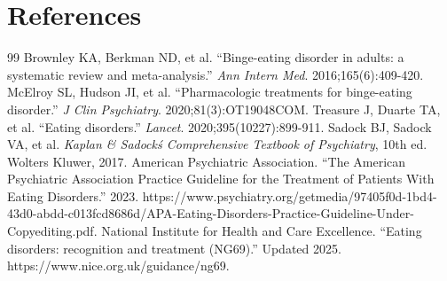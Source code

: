 \section*{References}
\begin{thebibliography}{99}
 Brownley KA, Berkman ND, et al. ``Binge-eating disorder in adults: a systematic review and meta-analysis.'' \textit{Ann Intern Med}. 2016;165(6):409-420.
 McElroy SL, Hudson JI, et al. ``Pharmacologic treatments for binge-eating disorder.'' \textit{J Clin Psychiatry}. 2020;81(3):OT19048COM.
 Treasure J, Duarte TA, et al. ``Eating disorders.'' \textit{Lancet}. 2020;395(10227):899-911.
 Sadock BJ, Sadock VA, et al. \textit{Kaplan \& Sadock\'s Comprehensive Textbook of Psychiatry}, 10th ed. Wolters Kluwer, 2017.
 American Psychiatric Association. ``The American Psychiatric Association Practice Guideline for the Treatment of Patients With Eating Disorders.'' 2023. https://www.psychiatry.org/getmedia/97405f0d-1bd4-43d0-abdd-c013fcd8686d/APA-Eating-Disorders-Practice-Guideline-Under-Copyediting.pdf.
 National Institute for Health and Care Excellence. ``Eating disorders: recognition and treatment (NG69).'' Updated 2025. https://www.nice.org.uk/guidance/ng69.
\end{thebibliography}

